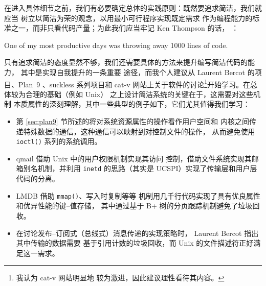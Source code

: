 在进入具体细节之前，我们有必要确定总体的实践原则：既然要追求简洁，我们就应当
树立以简洁为荣的观念，以用最小可行程序实现既定需求
作为编程能力的标准之一，而非只看代码产量；为此我们应当牢记 Ken Thompson 的话，%
：
\begin{quoting}
	One of my most productive days was throwing away 1000 lines of code.
\end{quoting}
只有追求简洁的态度显然不够，我们还需要具体的方法来提升编写简洁代码的能力，
其中是实现自我提升的一条重要
途径，而我个人建议从 Laurent Bercot 的项目、Plan~9%
、suckless 系列项目和 cat-v
网站上关于软件的讨论\footnote{我认为 cat-v 网站明显地
较为激进，因此建议理性看待其内容。}开始学习。在总体较为合理的基础（例如 Unix）
之上设计简洁系统的关键在于，这需要对这些机制
本质属性的深刻理解，其中一些典型的例子如下，它们尤其值得我们学习：
\begin{itemize}
\item 第 \ref{sec:plan9} 节所述的将对系统资源属性的操作看作用户空间和
	内核之间传递特殊数据的通信，这种通信可以映射到对控制文件的操作，
	从而避免使用 \verb|ioctl()| 系列的系统调用。
\item qmail 借助 Unix 中的用户权限机制实现其访问
	控制，借助文件系统实现其邮箱别名机制，并利用 \verb|inetd| 的思路（其实是
	UCSPI）实现了传输层和用户层代码的分离。
\item LMDB 借助 \verb|mmap()|、写入时复制等等
	机制用几千行代码实现了具有优良属性和优异性能的键{--}值存储，
	其中通过基于 B+ 树的分页跟踪机制避免了垃圾回收。
\item 在讨论发布{--}订阅式（总线式）消息传递的实现策略时，%
	Laurent Bercot 指出其中传输的数据需要
	基于引用计数的垃圾回收，而 Unix 的文件描述符正好满足这一需求。
\end{itemize}

